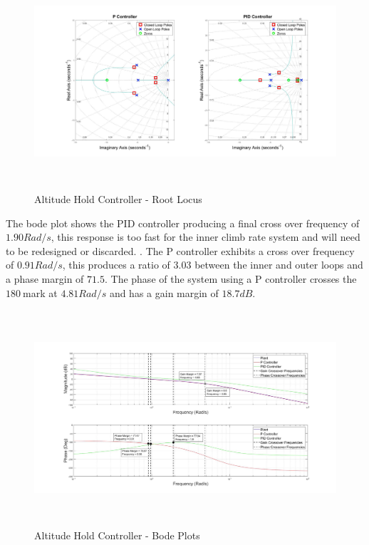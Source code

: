 	 \begin{figure}[H]
	 	\centering
	 	\includegraphics[height = 8cm]{../Design/Matlab/Controllers/altitude_root.jpg}
	 	\caption{Altitude Hold Controller -  Root Locus}
	 	\label{IM_AltHoldRoot}
	 \end{figure}
	 
	 The bode plot shows the PID controller producing a final cross over frequency of $1.90Rad/s$, this response is too fast for the inner climb rate system and will need to be redesigned or discarded. . The P controller exhibits a cross over frequency of $0.91Rad/s$, this produces a ratio of $3.03$ between the inner and outer loops and a phase margin of $71.5$\textdegree. The phase of the system using a P controller crosses the $180$\textdegree  $\ $mark at $4.81Rad/s$ and has a gain margin of $18.7dB$.
	 
	 \begin{figure}[H]
	 	\centering
	 	\includegraphics[height = 8cm]{../Design/Matlab/Controllers/altitude_bode.jpg}
	 	\caption{Altitude Hold Controller -  Bode Plots}
	 	\label{IM_AltHoldBode}
	 \end{figure}
	 
